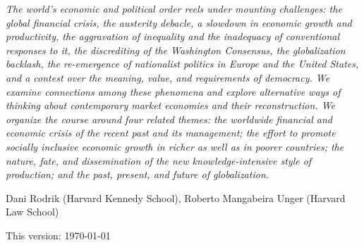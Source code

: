 \documentclass{article}
\begin{document}

\textit{The world’s economic and political order reels under mounting challenges: the global financial crisis, the austerity debacle, a slowdown in economic growth and productivity, the aggravation of inequality and the inadequacy of conventional responses to it, the discrediting of the Washington Consensus, the globalization backlash, the re-emergence of nationalist politics in Europe and the United States, and a contest over the meaning, value, and requirements of democracy. We examine connections among these phenomena and explore alternative ways of thinking about contemporary market economies and their reconstruction. We organize the course around four related themes: the worldwide financial and economic crisis of the recent past and its management; the effort to promote socially inclusive economic growth in richer as well as in poorer countries; the nature, fate, and dissemination of the new knowledge-intensive style of production; and the past, present, and future of globalization.}

Dani Rodrik (Harvard Kennedy School), Roberto Mangabeira Unger (Harvard Law School)

{\small This version: \today}

\tableofcontents


\end{document}
